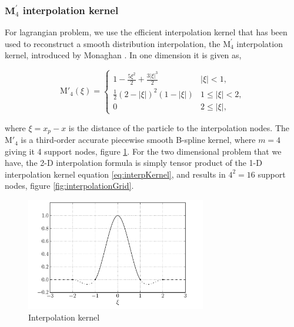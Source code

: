 \subsubsection*{$\mathbf{M}^\prime_4$ interpolation kernel}
For lagrangian problem, we use the efficient interpolation kernel that has been used to reconstruct a smooth distribution interpolation, the $\mathrm{M}^{\prime}_4$ interpolation kernel, introduced by Monaghan \cite{Monaghan1985}. In one dimension it is given as,

	\begin{equation}
	{\mathrm{M'}_4}\left( {\xi} \right) =
	  \begin{cases}
	   {1 - \frac{{5{\xi ^2}}}{2} + \frac{{3{{\left| \xi  \right|}^3}}}{2}} & {\left| \xi \right|} < 1, \\
	   \frac{1}{2}{\left( {2 - \left| \xi  \right|} \right)^2}\left( {1 - \left| \xi  \right|} \right) & 1 \le {\left| \xi \right|} < 2,\\
	   0 & 2 \le \left| \xi \right|,
	  \end{cases}
	\label{eq:interpKernel}
	\end{equation}

where $\xi = x_p - x$ is the distance of the particle to the interpolation nodes. The $\mathrm{M'}_4$ is a third-order accurate piecewise smooth B-spline kernel, where $m = 4$ giving it 4 support nodes, figure \ref{fig:interpolationKernel}. For the two dimensional problem that we have, the 2-D interpolation formula is simply tensor product of the 1-D interpolation kernel equation \ref{eq:interpKernel}, and results in $4^2 = 16$ support nodes, figure \ref{fig:interpolationGrid}.

	\begin{figure}[t]
	\centering
	\includegraphics[width=0.7\textwidth]{figures/lagrangian/interpolationKernel.pdf}
	\caption{Interpolation kernel}
	\label{fig:interpolationKernel}
	\end{figure}

